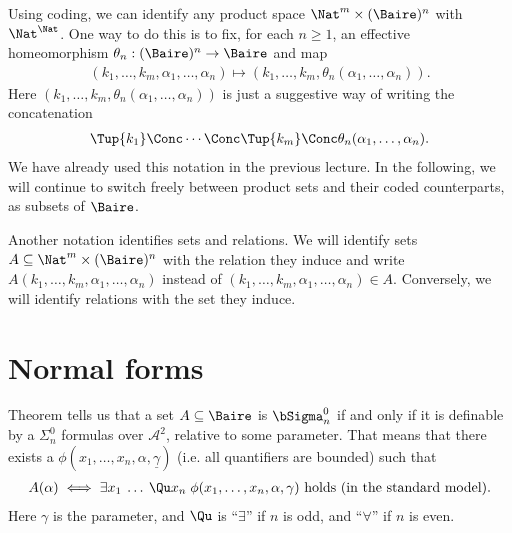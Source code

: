 \documentclass[letterpaper,10pt,english]{jupyterBook}
\begin{document}
\sphinxAtStartPar
Using coding, we can identify any product space \(\Nat^m \times (\Baire)^n\) with \(\Nat^\Nat\). One way to do this is to fix, for each \(n \geq 1\), an effective homeomorphism \(\theta_n: (\Baire)^n \to \Baire\) and map
\begin{equation*}
\begin{split}
	(k_1, \dots, k_m, \alpha_1, \dots, \alpha_n) \mapsto (k_1,\dots, k_m, \theta_n(\alpha_1, \dots, \alpha_n)).
\end{split}
\end{equation*}
\sphinxAtStartPar
Here \((k_1,\dots, k_m, \theta_n(\alpha_1, \dots, \alpha_n))\) is just a suggestive way of writing the concatenation
\begin{equation*}
\begin{split}
	\Tup{k_1} \Conc \cdots \Conc \Tup{k_m} \Conc \theta_n(\alpha_1, \dots, \alpha_n).
\end{split}
\end{equation*}
\sphinxAtStartPar
We have already used this notation in the previous lecture. In the following, we will continue to switch freely between product sets and their coded counterparts, as subsets of \(\Baire\).

\sphinxAtStartPar
Another notation identifies sets and relations. We will identify sets \(A \subseteq \Nat^m \times (\Baire)^n\) with the relation they induce and write \(A(k_1, \dots, k_m, \alpha_1, \dots, \alpha_n)\) instead of \((k_1, \dots, k_m, \alpha_1, \dots, \alpha_n) \in A\). Conversely, we will identify relations with the set they induce.


\section{Normal forms}
\label{\detokenize{structureBorel:normal-forms}}
\sphinxAtStartPar
Theorem {\hyperref[\detokenize{codingBorel:thm-Borel-arith}]{}} tells us that a set \(A \subseteq \Baire\) is \(\bSigma^0_n\) if and only if it is definable by a \(\Sigma^0_n\) formulas over \(\mathcal{A}^2\), relative to some parameter. That means that there exists a  \(\phi(x_1, \dots, x_n,\alpha,\underline{\gamma})\) (i.e. all quantifiers are bounded) such that
\begin{equation*}
\begin{split}
A(\alpha) \iff \exists x_1 \: \dots \: \Qu x_n \; \phi(x_1, \dots, x_n, \alpha,\gamma) \text{ holds (in the standard model).}
\end{split}
\end{equation*}
\sphinxAtStartPar
Here \(\gamma\) is the parameter, and \(\Qu\) is “\(\exists\)” if \(n\) is odd, and “\(\forall\)” if \(n\) is even.
\end{document}
